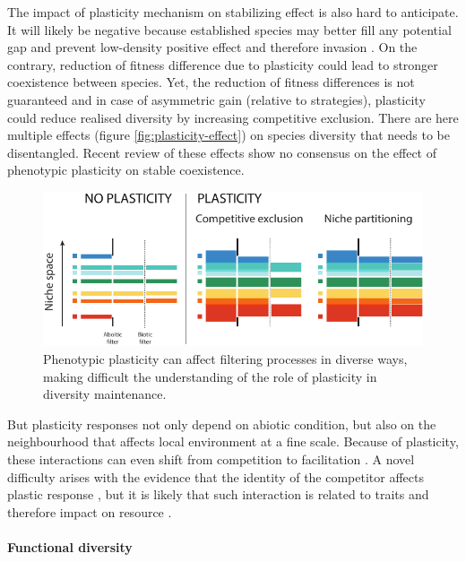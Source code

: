 The impact of plasticity mechanism on stabilizing effect is also hard to anticipate. It will likely be negative because established species may better fill any potential gap and prevent low-density positive effect and therefore invasion \parencite{berg_trait_2010}. On the contrary, reduction of fitness difference due to plasticity could lead to stronger coexistence between species. Yet, the reduction of fitness differences is not guaranteed and in case of asymmetric gain (relative to strategies), plasticity could reduce realised diversity by increasing competitive exclusion.
There are here multiple effects (figure \ref{fig:plasticity-effect}) on species diversity that needs to be disentangled. Recent review \parencite{turcotte_phenotypic_2016} of these effects show no consensus on the effect of phenotypic plasticity on stable coexistence.

\begin{figure}
    \includegraphics[width=1\linewidth]{./1_Introduction/graphics/filtering.pdf}
  \caption[Effect of plasticity of filters]{Phenotypic plasticity can affect filtering processes in diverse ways, making difficult the understanding of the role of plasticity in diversity maintenance.}
  \label{fig:plasticity_form}
\end{figure}

But plasticity responses not only depend on abiotic condition, but also on the neighbourhood that affects local environment \parencite{sultan_phenotypic_1995} at a fine scale. Because of plasticity, these interactions can even shift from competition to facilitation \parencite{callaway_phenotypic_2003}. A novel difficulty arises with the evidence that the identity of the competitor affects plastic response \parencite{callaway_phenotypic_2003, abakumova_plasticity_2016}, but it is likely that such interaction is related to traits and therefore impact on resource \parencite{callaway_phenotypic_2003}.

\paragraph{Functional diversity}

